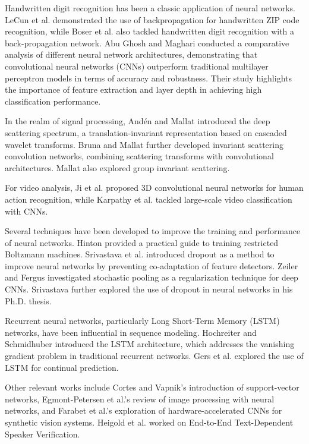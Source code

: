 \documentclass{article}
\begin{document}
Handwritten digit recognition has been a classic application of neural networks. LeCun et al. \cite{23} demonstrated the use of backpropagation for handwritten ZIP code recognition, while Boser et al. \cite{3} also tackled handwritten digit recognition with a back-propagation network. Abu Ghosh and Maghari \cite{1} conducted a comparative analysis of different neural network architectures, demonstrating that convolutional neural networks (CNNs) outperform traditional multilayer perceptron models in terms of accuracy and robustness. Their study highlights the importance of feature extraction and layer depth in achieving high classification performance.

In the realm of signal processing, Andén and Mallat \cite{1} introduced the deep scattering spectrum, a translation-invariant representation based on cascaded wavelet transforms. Bruna and Mallat \cite{2} further developed invariant scattering convolution networks, combining scattering transforms with convolutional architectures. Mallat \cite{27} also explored group invariant scattering.

For video analysis, Ji et al. \cite{20} proposed 3D convolutional neural networks for human action recognition, while Karpathy et al. \cite{21} tackled large-scale video classification with CNNs.

Several techniques have been developed to improve the training and performance of neural networks. Hinton \cite{17} provided a practical guide to training restricted Boltzmann machines. Srivastava et al. \cite{18} introduced dropout as a method to improve neural networks by preventing co-adaptation of feature detectors. Zeiler and Fergus \cite{37} investigated stochastic pooling as a regularization technique for deep CNNs. Srivastava \cite{30} further explored the use of dropout in neural networks in his Ph.D. thesis.

Recurrent neural networks, particularly Long Short-Term Memory (LSTM) networks, have been influential in sequence modeling. Hochreiter and Schmidhuber \cite{19} introduced the LSTM architecture, which addresses the vanishing gradient problem in traditional recurrent networks. Gers et al. \cite{14} explored the use of LSTM for continual prediction.

Other relevant works include Cortes and Vapnik's \cite{10} introduction of support-vector networks, Egmont-Petersen et al.'s \cite{11} review of image processing with neural networks, and Farabet et al.'s \cite{12} exploration of hardware-accelerated CNNs for synthetic vision systems. Heigold et al. \cite{16} worked on End-to-End Text-Dependent Speaker Verification.
\end{document}
